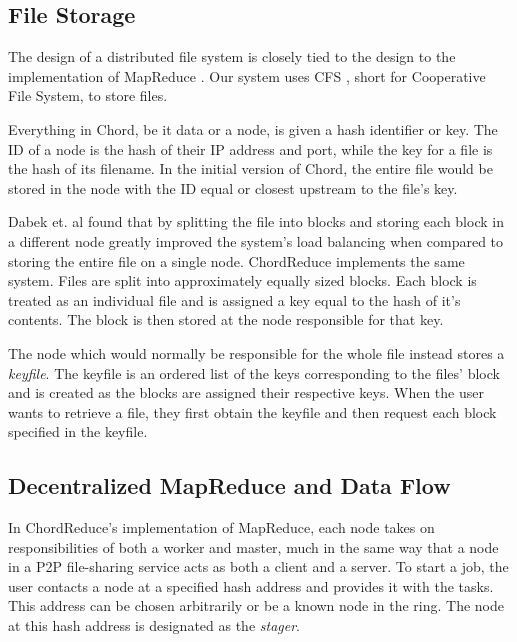 \documentclass[10pt, conference, compsocconf]{IEEEtran}
\begin{document}
\subsection{File Storage}
The design of a distributed file system is closely tied to the design to the implementation of MapReduce \cite{gfs} \cite{hdfs}.  Our system uses CFS \cite{CFS}, short for Cooperative File System, to store files.  

Everything in Chord, be it data or a node, is given a hash identifier or key. The ID of a node is the hash of their IP address and port, while the key for a file is the hash of its filename.  In the initial version of Chord, the entire file would be stored in the node with the ID equal or closest upstream to the file's key.

Dabek et. al found that by splitting the file into blocks and storing each block in a different node greatly improved the system's load balancing when compared to storing the entire file on a single node\cite{CFS}. ChordReduce implements the same system.  Files are split into approximately equally sized blocks.  Each block is treated as an individual file and is assigned a key equal to the hash of it's contents.  The block is then stored at the node responsible for that key.  

The node which would normally be responsible for the whole file instead stores a \textit{keyfile}.  The keyfile is an ordered list of the keys corresponding to the files' block and is created as the blocks are assigned their respective keys.  When the user wants to retrieve a file, they first obtain the keyfile and then request each block specified in the keyfile.



\subsection{Decentralized MapReduce and Data Flow} 
In ChordReduce's implementation of MapReduce, each node takes on responsibilities of both a worker and master, much in the same way that a node in a P2P file-sharing service acts as both a client and a server.  To start a job, the user contacts a node at a specified hash address and provides it with the tasks.  This address can be chosen arbitrarily or be a known node in the ring. The node at this hash address is designated as the \textit{stager}.  
\end{document}
